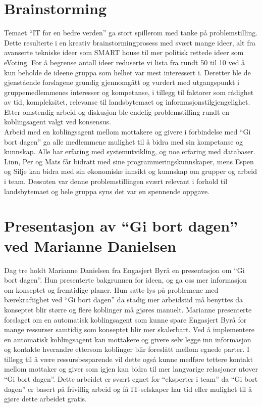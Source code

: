 \section{Brainstorming}
Temaet ``IT for en bedre verden'' ga stort spillerom med tanke på problemstilling. Dette resulterte i en kreativ brainstormingprosess med svært mange ideer, alt fra avanserte tekniske ideer som SMART house til mer politisk rettede ideer som eVoting. For å begrense antall ideer reduserte vi lista fra rundt 50 til 10 ved å kun beholde de ideene gruppa som helhet var mest interessert i. Deretter ble de gjenstående forslagene grundig gjennomgått og vurdert med utgangspunkt i gruppemedlemmenes interesser og kompetanse, i tillegg til faktorer som rådighet av tid, kompleksitet, relevanse til landsbytemaet og informasjonstilgjengelighet. Etter omstendig arbeid og diskusjon ble endelig problemstilling rundt en koblingsagent valgt ved konsensus.\\

Arbeid med en koblingsagent mellom mottakere og givere i forbindelse med ``Gi bort dagen'' ga alle medlemmene mulighet til å bidra med sin kompetanse og kunnskap. Alle har erfaring med systemutvikling, og noe erfaring med databaser. Linn, Per og Mats får bidratt med sine programmeringskunnskaper, mens Espen og Silje kan bidra med sin økonomiske innsikt og kunnskap om grupper og arbeid i team. Dessuten var denne problemstillingen svært relevant i forhold til landsbytemaet og hele gruppa syns det var en spennende oppgave.\\

\section{Presentasjon av ``Gi bort dagen'' ved Marianne Danielsen}
Dag tre holdt Marianne Danielsen fra Engasjert Byrå en presentasjon om ``Gi bort dagen''. Hun presenterte bakgrunnen for ideen, og ga oss mer informasjon om konseptet og fremtidige planer. Hun satte lys på problemene med bærekraftighet ved ``Gi bort dagen'' da stadig mer arbeidstid må benyttes da konseptet blir større og flere koblinger må gjøres manuelt. Marianne presenterte forslaget om en automatisk koblingsagent som kunne spare Engasjert Byrå for mange ressurser samtidig som konseptet blir mer skalerbart. Ved å implementere en automatisk koblingsagent kan mottakere og givere selv legge inn informasjon og kontakte hverandre ettersom koblinger blir foreslått mellom egnede parter. I tillegg til å være ressursbesparende vil dette også kunne medføre tettere kontakt mellom mottaker og giver som igjen kan bidra til mer langvarige relasjoner utover ``Gi bort dagen''. Dette arbeidet er svært egnet for ``eksperter i team'' da ``Gi bort dagen'' er basert på frivillig arbeid og få IT-selskaper har tid eller mulighet til å gjøre dette arbeidet gratis.\\

